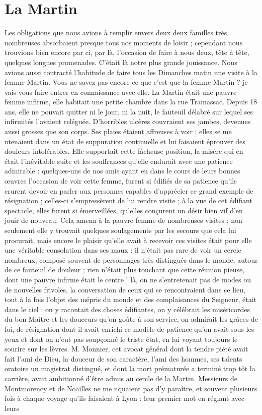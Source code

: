 \documentclass[11pt,a4paper]{report}
\begin{document}
\section*{La Martin}

Les obligations que nous avions à remplir envers deux deux familles très nombreuses absorbaient presque tous nos moments de loisir ; cependant nous trouvions bien encore par ci, par là, l'occasion de faire à nous deux, tête à tête, quelques longues promenades. C'était là notre plus grande jouissance. Nous avions aussi contracté l'habitude de faire tous les Dimanches matin une visite à la femme Martin. Vous ne savez pas encore ce que c'est que la femme Martin ? je vais vous faire entrer en connaissance avec elle. La Martin était une pauvre femme infirme, elle habitait une petite chambre dans la rue Tramassac. Depuis 18 ans, elle ne pouvait quitter ni le jour, ni la nuit, le fauteuil délabré sur lequel ses infirmités l'avaient reléguée. D'horribles ulcères couvraient ses jambes, devenues aussi grosses que son corps. Ses plaies étaient affreuses à voir ; elles se me ntenaient dans un état de suppuration continuelle et lui faisaient éprouver des douleurs intolérables. Elle supportait cette fâcheuse position, la misère qui en était l'inévitable suite et les souffrances qu'elle endurait avec une patience admirable : quelques-uns de nos amis ayant eu dans le cours de leurs bonnes œuvres l'occasion de voir cette femme, furent si édifiés de sa patience qu'ils crurent devoir en parler aux personnes capables d'apprécier ce grand exemple de résignation ; celles-ci s'empressèrent de lui rendre visite ; à la vue de cet édifiant spectacle, elles furent si émerveillées, qu'elles conçurent un désir bien vif d'en jouir de nouveau. Cela amena à la pauvre femme de nombreuses visites ; non seulement elle y trouvait quelques soulagements par les secours que cela lui procurait, mais encore le plaisir qu'elle avait à recevoir ces visites était pour elle une véritable consolation dans ses maux : il n'était pas rare de voir un cercle nombreux, composé souvent de personnages très distingués dans le monde, autour de ce fauteuil de douleur ; rien n'était plus touchant que cette réunion pieuse, dont une pauvre infirme était le centre ! là, on ne s'entretenait pas de modes ou de nouvelles frivoles, la conversation de ceux qui se rencontraient dans ce lieu, tout à la fois l'objet des mépris du monde et des complaisances du Seigneur, était dans le ciel : on y racontait des choses édifiantes, on y célébrait les miséricordes du bon Maître et les douceurs qu'on goûte à son service, on admirait les grâces de foi, de résignation dont il avait enrichi ce modèle de patience qu'on avait sous les yeux et dont on n'eut pas soupçonné le triste état, en lui voyant toujours le sourire sur les lèvres. M. Monnier, cet avocat général dont la tendre piété avait fait l'ami de Dieu, la douceur de son caractère, l'ami des hommes, ses talents oratoire un magistrat distingué, et dont la mort prématurée a terminé trop tôt la carrière, avait ambitionné d'être admis au cercle de la Martin. Messieurs de Montmorency et de Noailles ne me nquaient pas d'y paraître, et souvent plusieurs fois à chaque voyage qu'ils faisaient à Lyon : leur premier mot en réglant avec leurs 
\end{document}
